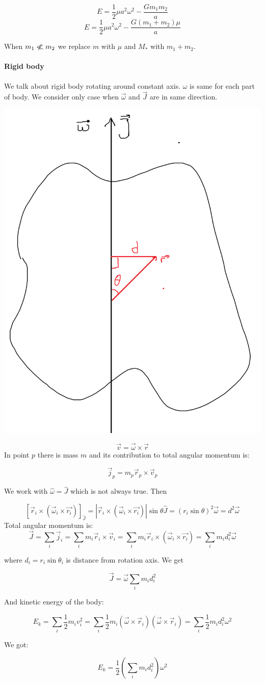$$E = \frac{1}{2}\mu a^2\omega^2 - \frac{Gm_1m_2}{a}$$
$$E = \frac{1}{2}\mu a^2\omega^2 - \frac{G\left(m_1+m_2\right)\mu}{a}$$

When $m_1 \centernot\ll m_2$ we replace $m$ with $\mu$ and $M_*$ with $m_1+m_2$.

\paragraph{Rigid body} We talk about rigid body rotating around constant axis. $\omega$ is same for each part of body. We consider only case when $\vec{\omega}$ and $\vec{J}$ are in same direction.


\begin{center}
	\includegraphics[width=0.1\linewidth]{./lect16/pic2.png}
\end{center}

$$\vec{v} = \vec{\omega} \times \vec{r}$$
In point $p$ there is mass $m$ and its contribution to total angular momentum is:

$$\vec{j}_p = m_p \vec{r}_p \times \vec{v}_p$$

We work with $\hat{\omega} = \hat{J}$ which is not always true. Then

$$\left[\vec{r}_i \times \left(\vec{\omega}_i \times \vec{r_i}\right)\right]_{\hat{J}} = \left| \vec{r}_i \times \left(\vec{\omega}_i \times \vec{r_i} \right) \right| \sin \theta \hat{J} = \left( r_i \sin \theta \right)^2 \vec{\omega} = d^2 \vec{\omega}$$
 Total angular momentum is:
$$\vec{J} = \sum_i \vec{j}_i = \sum_i m_i \vec{r}_i \times \vec{v}_i =\sum_i m_i \vec{r}_i \times \left(\vec{\omega}_i \times \vec{r_i}\right) = \sum_i m_i d_i^2 \vec{\omega}$$

where $d_i = r_i \sin \theta_i$ is distance from rotation axis. We get

$$\vec{J} = \vec{\omega} \sum_i m_id_i^2$$

And kinetic energy of the body:

$$E_k = \sum_i \frac{1}{2} m_i v_i^2 = \sum_i \frac{1}{2} m_i \left( \vec{\omega} \times \vec{r}_i \right) \left( \vec{\omega} \times \vec{r}_i \right) = \sum_i \frac{1}{2} m_i d_i^2 \omega^2$$

We got:

$$E_k = \frac{1}{2}\left( \sum_i m_i d_i^2 \right) \omega^2$$

